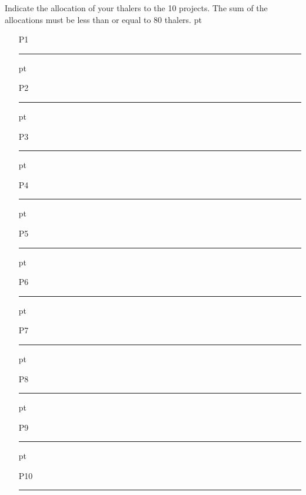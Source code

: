 \documentclass[11pt, oneside]{article}   	%
\begin{document}
Indicate the allocation of your thalers to the 10 projects. The sum of the allocations must be less than or equal to 80 thalers. 
 pt
\begin{enumerate}
\setlength\itemsep{18pt}
\item[P1] \rule{6cm}{2pt}
 pt
\item[P2] \rule{6cm}{2pt}
 pt
\item[P3] \rule{6cm}{2pt}
 pt
\item[P4] \rule{6cm}{2pt}
 pt
\item[P5] \rule{6cm}{2pt}
 pt
\item[P6] \rule{6cm}{2pt}
 pt
\item[P7] \rule{6cm}{2pt}
 pt
\item[P8] \rule{6cm}{2pt}
 pt
\item[P9] \rule{6cm}{2pt}
 pt
\item[P10] \rule{6cm}{2pt}
\end{enumerate}
\end{document}
